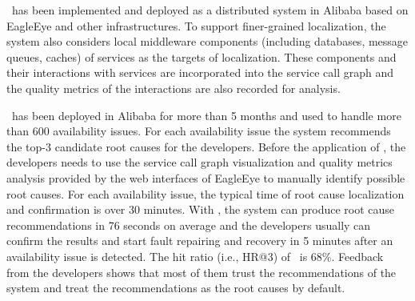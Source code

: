 \app~has been implemented and deployed as a distributed system in Alibaba based on EagleEye and other infrastructures.
To support finer-grained localization, the system also considers local middleware components (including databases, message queues, caches) of services as the targets of localization.
These components and their interactions with services are incorporated into the service call graph and the quality metrics of the interactions are also recorded for analysis.

\app~has been deployed in Alibaba for more than 5 months and used to handle more than 600 availability issues.
For each availability issue the system recommends the top-3 candidate root causes for the developers.
Before the application of \app, the developers needs to use the service call graph visualization and quality metrics analysis provided by the web interfaces of EagleEye to manually identify possible root causes.
For each availability issue, the typical time of root cause localization and confirmation is over 30 minutes.
With \app, the system can produce root cause recommendations in 76 seconds on average and the developers usually can confirm the results and start fault repairing and recovery in 5 minutes after an availability issue is detected.
The hit ratio (i.e., HR@3) of \app~is 68\%.
Feedback from the developers shows that most of them trust the recommendations of the system and treat the recommendations as the root causes by default.

%


